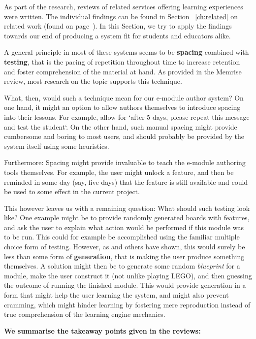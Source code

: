 As part of the research, reviews of related services offering learning
experiences were written. The individual findings can be found in Section
~\ref{ch:related} on related work (found on page~\pageref{ch:related}). In this
Section, we try to apply the findings towards our end of producing a system fit
for students and educators alike.

A general principle in most of these systems seems to be \textbf{spacing}
combined with \textbf{testing}, that is the pacing of repetition throughout time
to increase retention and foster comprehension of the material at hand. As
provided in the Memrise review, most research on the topic supports this
technique.

What, then, would such a technique mean for our e-module author system? On one
hand, it might an option to allow authors themselves to introduce spacing into
their lessons. For example, allow for `after 5 days, please repeat this message
and test the student`. On the other hand, such manual spacing might provide
cumbersome and boring to most users, and should probably be provided by the
system itself using some heuristics.

Furthermore: Spacing might provide invaluable to teach the e-module authoring
tools themselves. For example, the user might unlock a feature, and then be
reminded in some day (say, five days) that the feature is still available and
could be used to some effect in the current project.

This however leaves us with a remaining question: What should such testing look
like? One example might be to provide randomly generated boards with features,
and ask the user to explain what action would be performed if this module was to
be run. This could for example be accomplished using the familiar multiple
choice form of testing. However, as \cite{potts2014benefit} and others have
shown, this would surely be less than some form of \textbf{generation}, that is
making the user produce something themselves. A solution might then be to
generate some random \textit{blueprint} for a module, make the user construct it
(not unlike playing LEGO), and then guessing the outcome of running the finished
module. This would provide generation in a form that might help the user
learning the system, and might also prevent cramming, which might hinder
learning by fostering mere reproduction instead of true comprehension of the
learning engine mechanics.

\textbf{We summarise the takeaway points given in the reviews:}

